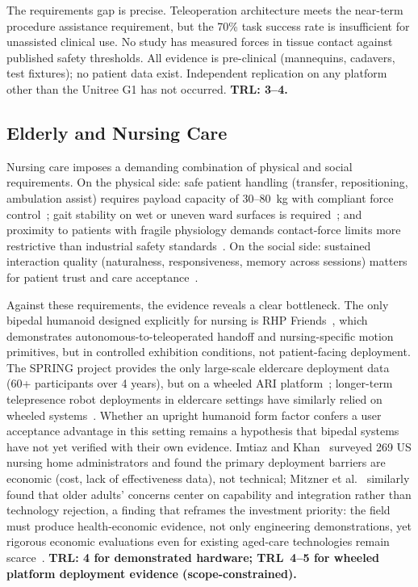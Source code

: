 The requirements gap is precise. Teleoperation architecture meets the
near-term procedure assistance requirement, but the 70\% task success rate is
insufficient for unassisted clinical use. No study has measured forces in
tissue contact against published safety thresholds. All evidence is pre-clinical
(mannequins, cadavers, test fixtures); no patient data exist. Independent
replication on any platform other than the Unitree G1 has not occurred.
\textbf{TRL: 3--4.}

\subsection{Elderly and Nursing Care}
\label{sec:eldercare}

Nursing care imposes a demanding combination of physical and social requirements.
On the physical side: safe patient handling (transfer, repositioning, ambulation
assist) requires payload capacity of 30--80~kg with compliant force
control~\cite{mukai2010riba}; gait stability on wet or uneven ward surfaces is
required~\cite{niosh2011slips,joeoh2019terrain}; and proximity to
patients with fragile physiology demands contact-force limits more restrictive
than industrial safety standards~\cite{iso13482,iso10218_1}. On the social side: sustained interaction
quality (naturalness, responsiveness, memory across sessions) matters for
patient trust and care acceptance~\cite{zafrani2022betweenfear}.

Against these requirements, the evidence reveals a clear bottleneck. The only
bipedal humanoid designed explicitly for nursing is RHP
Friends~\cite{benallegue2025rhp}, which demonstrates autonomous-to-teleoperated
handoff and nursing-specific motion primitives, but in controlled exhibition
conditions, not patient-facing deployment. The SPRING project provides the only
large-scale eldercare deployment data (60+ participants over 4 years), but on a
wheeled ARI platform~\cite{alamedapineda2024spring}; longer-term telepresence
robot deployments in eldercare settings have similarly relied on wheeled
systems~\cite{cesta2016amicare}. Whether an upright humanoid form factor confers
a user acceptance advantage in this setting remains a hypothesis that bipedal
systems have not yet verified with their own evidence. Imtiaz and
Khan~\cite{imtiaz2024perceptions} surveyed 269 US nursing
home administrators and found the primary deployment barriers are economic
(cost, lack of effectiveness data), not technical; Mitzner et
al.~\cite{mitzner2018technology} similarly found that older adults' concerns
center on capability and integration rather than technology rejection, a finding
that reframes the investment priority: the field must produce health-economic
evidence, not only engineering demonstrations, yet rigorous economic evaluations
even for existing aged-care technologies remain
scarce~\cite{bulamu2018economic}. \textbf{TRL: 4 for demonstrated hardware;
TRL~4--5 for wheeled platform deployment evidence (scope-constrained).}

